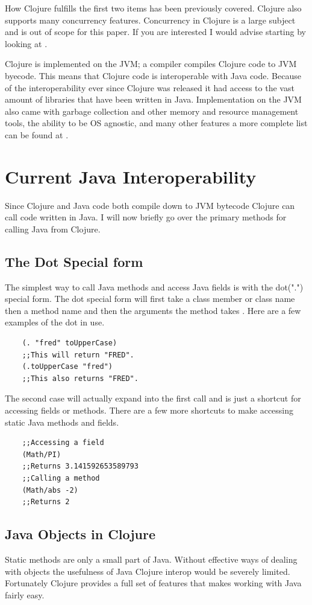 \documentclass[12pt]{article}
\begin{document}
	How Clojure fulfills the first two items has been previously covered. Clojure also supports many concurrency features. Concurrency in Clojure is a large subject and is out of scope for this paper. If you are interested I would advise starting by looking at \cite{cloj:concurrency}.
	
	Clojure is implemented on the JVM; a compiler compiles Clojure code to JVM byecode. This means that Clojure code is interoperable with Java code. Because of the interoperability ever since Clojure was released it had access to the vast amount of libraries that have been written in Java. Implementation on the JVM also came with garbage collection and other memory and resource management tools, the ability to be OS agnostic, and many other features a more complete list can be found at \cite{cloj:rationale}.   

\section{Current Java Interoperability}\label{sec:bg}
	Since Clojure and Java code both compile down to JVM bytecode Clojure can call code written in Java. I will now briefly go over the primary methods for calling Java from Clojure.
	
	\subsection{The Dot Special form}
	The simplest way to call Java methods and access Java fields is with the dot(".") special form. The dot special form will first take a class member or class name then a method name and then the arguments the method takes \cite{cloj:interop}. Here are a few examples of the dot in use.
	\begin{verbatim}
	(. "fred" toUpperCase)
	;;This will return "FRED".
	(.toUpperCase "fred")
	;;This also returns "FRED".
	\end{verbatim}
	The second case will actually expand into the first call and is just a shortcut for accessing fields or methods. There are a few more shortcuts to make accessing static Java methods and fields.
	
	\begin{verbatim}
	;;Accessing a field
	(Math/PI)
	;;Returns 3.141592653589793
	;;Calling a method
	(Math/abs -2)
	;;Returns 2
	\end{verbatim}
	
	\subsection{Java Objects in Clojure}
	Static methods are only a small part of Java. Without effective ways of dealing with objects the usefulness of Java Clojure interop would be severely limited. Fortunately Clojure provides a full set of features that makes working with Java fairly easy.
	
\end{document}
